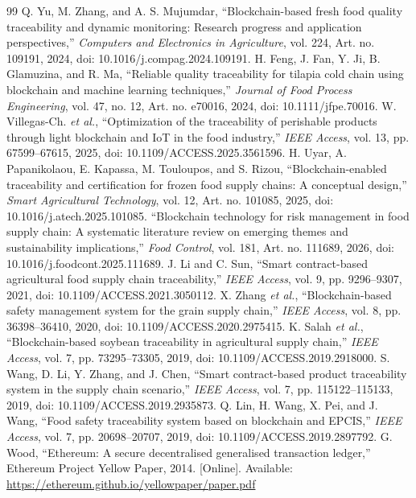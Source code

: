 \documentclass[conference,a4paper]{IEEEtran}
\begin{document}
\begin{thebibliography}{99}
 Q. Yu, M. Zhang, and A. S. Mujumdar, ``Blockchain-based fresh food quality traceability and dynamic monitoring: Research progress and application perspectives,'' \textit{Computers and Electronics in Agriculture}, vol. 224, Art. no. 109191, 2024, doi: 10.1016/j.compag.2024.109191.
 H. Feng, J. Fan, Y. Ji, B. Glamuzina, and R. Ma, ``Reliable quality traceability for tilapia cold chain using blockchain and machine learning techniques,'' \textit{Journal of Food Process Engineering}, vol. 47, no. 12, Art. no. e70016, 2024, doi: 10.1111/jfpe.70016.
 W. Villegas-Ch. \textit{et al.}, ``Optimization of the traceability of perishable products through light blockchain and IoT in the food industry,'' \textit{IEEE Access}, vol. 13, pp. 67599--67615, 2025, doi: 10.1109/ACCESS.2025.3561596.
 H. Uyar, A. Papanikolaou, E. Kapassa, M. Touloupos, and S. Rizou, ``Blockchain-enabled traceability and certification for frozen food supply chains: A conceptual design,'' \textit{Smart Agricultural Technology}, vol. 12, Art. no. 101085, 2025, doi: 10.1016/j.atech.2025.101085.
 ``Blockchain technology for risk management in food supply chain: A systematic literature review on emerging themes and sustainability implications,'' \textit{Food Control}, vol. 181, Art. no. 111689, 2026, doi: 10.1016/j.foodcont.2025.111689.
 J. Li and C. Sun, ``Smart contract-based agricultural food supply chain traceability,'' \textit{IEEE Access}, vol. 9, pp. 9296--9307, 2021, doi: 10.1109/ACCESS.2021.3050112.
 X. Zhang \textit{et al.}, ``Blockchain-based safety management system for the grain supply chain,'' \textit{IEEE Access}, vol. 8, pp. 36398--36410, 2020, doi: 10.1109/ACCESS.2020.2975415.
 K. Salah \textit{et al.}, ``Blockchain-based soybean traceability in agricultural supply chain,'' \textit{IEEE Access}, vol. 7, pp. 73295--73305, 2019, doi: 10.1109/ACCESS.2019.2918000.
 S. Wang, D. Li, Y. Zhang, and J. Chen, ``Smart contract-based product traceability system in the supply chain scenario,'' \textit{IEEE Access}, vol. 7, pp. 115122--115133, 2019, doi: 10.1109/ACCESS.2019.2935873.
 Q. Lin, H. Wang, X. Pei, and J. Wang, ``Food safety traceability system based on blockchain and EPCIS,'' \textit{IEEE Access}, vol. 7, pp. 20698--20707, 2019, doi: 10.1109/ACCESS.2019.2897792.
 G. Wood, ``Ethereum: A secure decentralised generalised transaction ledger,'' Ethereum Project Yellow Paper, 2014. [Online]. Available: \url{https://ethereum.github.io/yellowpaper/paper.pdf}

\end{thebibliography}
\end{document}

